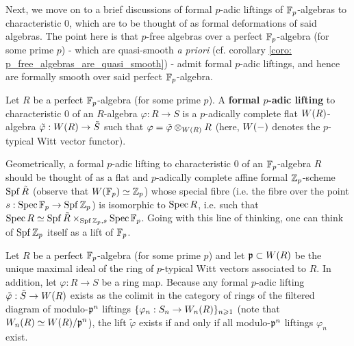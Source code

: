             Next, we move on to a brief discussions of formal $p$-adic liftings of $\mathbb{F}_p$-algebras to characteristic $0$, which are to be thought of as formal deformations of said algebras. The point here is that $p$-free algebras over a perfect $\mathbb{F}_p$-algebra (for some prime $p$) - which are quasi-smooth \textit{a priori} (cf. corollary \ref{coro: p_free_algebras_are_quasi_smooth}) - admit formal $p$-adic liftings, and hence are formally smooth over said perfect $\mathbb{F}_p$-algebra.
            \begin{definition} \label{def: formal_p_adic_liftings_of_characteristic_p_rings}
                Let $R$ be a perfect $\mathbb{F}_p$-algebra (for some prime $p$). A \textbf{formal $p$-adic lifting} to characteristic $0$ of an $R$-algebra $\varphi: R \to S$ is a $p$-adically complete flat $W(R)$-algebra $\tilde{\varphi}: W(R) \to \tilde{S}$ such that $\varphi = \tilde{\varphi} \tensor_{\Witt(R)} R$ (here, $W(-)$ denotes the $p$-typical Witt vector functor).
            \end{definition}
            \begin{remark}
                Geometrically, a formal $p$-adic lifting to characteristic $0$ of an $\mathbb{F}_p$-algebra $R$ should be thought of as a flat and $p$-adically complete affine formal $\mathbb{Z}_p$-scheme $\operatorname{Spf} \tilde{R}$ (observe that $W(\mathbb{F}_p) \simeq \mathbb{Z}_p$) whose special fibre (i.e. the fibre over the point $s: \operatorname{Spec} \mathbb{F}_p \to \operatorname{Spf} \mathbb{Z}_p$) is isomorphic to $\operatorname{Spec} R$, i.e. such that $\Spec R \cong \Spf \tilde{R} \x_{\Spf \Z_p, s} \Spec \F_p$. Going with this line of thinking, one can think of $\operatorname{Spf} \mathbb{Z}_p$ itself as a lift of $\mathbb{F}_p$.
            \end{remark}
            \begin{remark} \label{remark: truncated_formal_p_adic_liftings}
                Let $R$ be a perfect $\mathbb{F}_p$-algebra (for some prime $p$) and let $\mathfrak{p} \subset W(R)$ be the unique maximal ideal of the ring of $p$-typical Witt vectors associated to $R$. In addition, let $\varphi: R \to S$ be a ring map. Because any formal $p$-adic lifting $\tilde{\varphi}: \tilde{S} \to W(R)$ exists as the colimit in the category of rings of the filtered diagram of modulo-$\mathfrak{p}^n$ liftings $\{\varphi_n: S_n \to W_n(R)\}_{n \geqslant 1}$ (note that $W_n(R) \simeq W(R)/\mathfrak{p}^n$), the lift $\tilde{\varphi}$ exists if and only if all modulo-$\mathfrak{p}^n$ liftings $\varphi_n$ exist. 
            \end{remark}
